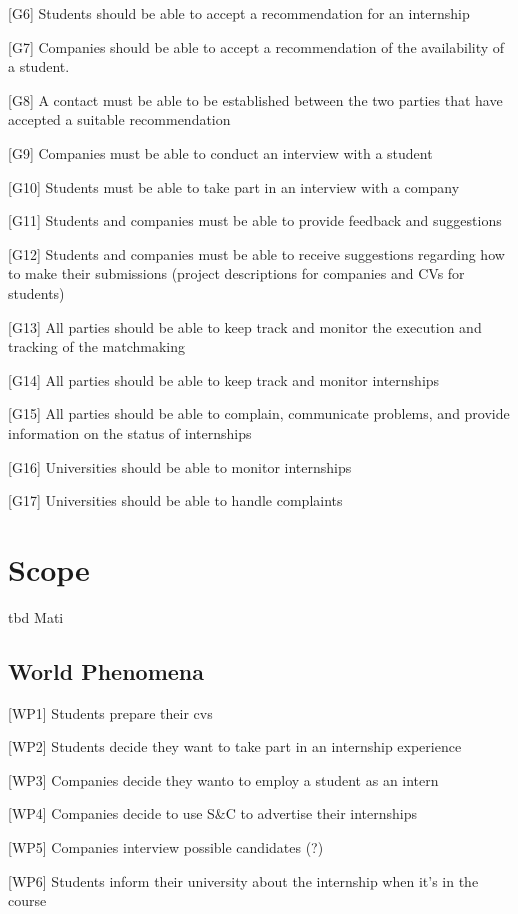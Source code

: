 [G6] Students should be able to accept a recommendation for an internship  

[G7] Companies should be able to accept a recommendation of the availability of a student. 

[G8] A contact must be able to be established between the two parties that have accepted a suitable recommendation  


[G9] Companies must be able to conduct an interview with a student 


[G10] Students must be able to take part in an interview with a company

[G11] Students and companies must be able to provide feedback and suggestions

[G12] Students and companies must be able to receive suggestions regarding how to make their submissions (project descriptions for companies and CVs for students)

[G13] All parties should be able to keep track and monitor the execution and tracking of the matchmaking

[G14] All parties should be able to keep track and monitor internships

[G15] All parties should be able to complain, communicate problems, and provide information on the status of internships

[G16] Universities should be able to monitor internships

[G17] Universities should be able to handle complaints



\section{Scope}
tbd Mati
\subsection{World Phenomena}
[WP1] Students prepare their cvs

[WP2] Students decide they want to take part in an internship experience

[WP3] Companies decide they wanto to employ a student as an intern

[WP4] Companies decide to use S\&C to advertise their internships

[WP5] Companies interview possible candidates (?)

[WP6] Students inform their university about the internship when it's in the course

